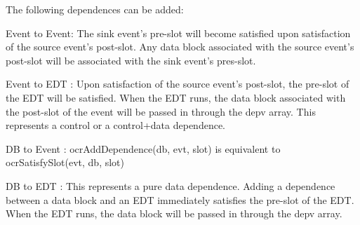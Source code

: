 \descr
The following dependences can be added\-:
\begin{DoxyItemize}
\item Event to Event\-: The sink event's pre-\/slot will become satisfied upon satisfaction of the source event's post-\/slot. Any data block associated with the source event's post-\/slot will be associated with the sink event's pres-\/slot.
\item Event to E\-D\-T \-: Upon satisfaction of the source event's post-\/slot, the pre-\/slot of the E\-D\-T will be satisfied. When the E\-D\-T runs, the data block associated with the post-\/slot of the event will be passed in through the depv array. This represents a control or a control+data dependence.
\item D\-B to Event \-: ocr\-Add\-Dependence(db, evt, slot) is equivalent to ocr\-Satisfy\-Slot(evt, db, slot)
\item D\-B to E\-D\-T \-: This represents a pure data dependence. Adding a dependence between a data block and an E\-D\-T immediately satisfies the pre-\/slot of the E\-D\-T. When the E\-D\-T runs, the data block will be passed in through the depv array.
\end{DoxyItemize}


